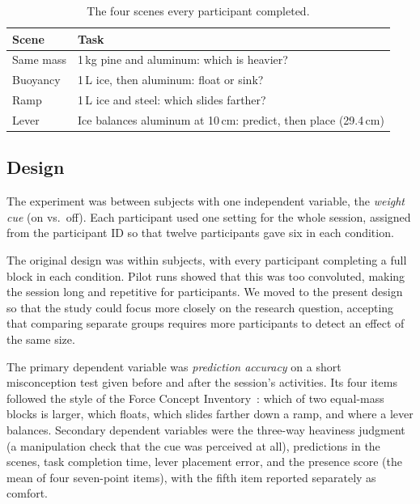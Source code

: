 \documentclass[sigconf,nonacm]{acmart}
\begin{document}
\begin{table}[h]
  \caption{The four scenes every participant completed.}
  \label{tab:scenes}
  \begin{tabular}{p{}p{}}
    \toprule
    Scene & Task \\
    \midrule
    Same mass & 1\,kg pine and aluminum: which is heavier? \\
    Buoyancy & 1\,L ice, then aluminum: float or sink? \\
    Ramp & 1\,L ice and steel: which slides farther? \\
    Lever & Ice balances aluminum at 10\,cm: predict, then place (29.4\,cm) \\
    \bottomrule
  \end{tabular}
\end{table}

\subsection{Design}
The experiment was between subjects with one independent variable, the \emph{weight cue}
(on vs.\ off). Each participant used one setting for the whole session, assigned from the
participant ID so that twelve participants gave six in each condition.

The original design was within subjects, with every participant completing a full block in
each condition. Pilot runs showed that this was too convoluted, making the session long and
repetitive for participants. We moved to the present design so that the study could focus
more closely on the research question, accepting that comparing separate groups requires
more participants to detect an effect of the same size.

The primary dependent variable was \emph{prediction accuracy} on a short misconception test
given before and after the session's activities. Its four items
followed the style of the Force Concept Inventory~\cite{hestenes1992force}: which of two
equal-mass blocks is larger, which floats, which slides farther down a ramp, and where a lever
balances. Secondary
dependent variables were the three-way heaviness judgment (a manipulation check that the
cue was perceived at all), predictions in the scenes, task completion time, lever placement
error, and the presence score (the mean of four seven-point items), with the fifth item
reported separately as comfort.
\end{document}
